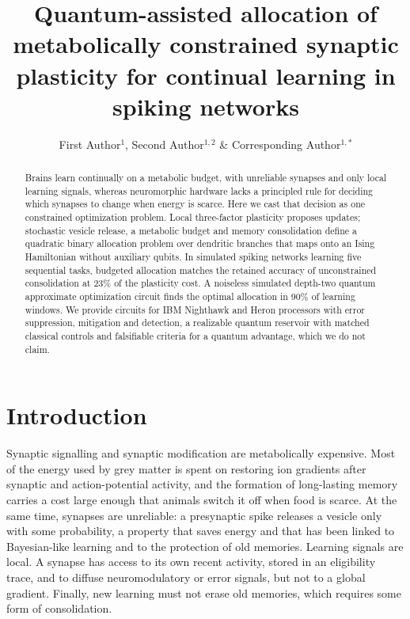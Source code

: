 
\title{Quantum-assisted allocation of metabolically constrained synaptic plasticity for continual learning in spiking networks}

\author{First Author$^{1}$, Second Author$^{1,2}$ \& Corresponding Author$^{1,*}$}


\begin{abstract}
Brains learn continually on a metabolic budget, with unreliable synapses and only local learning signals, whereas neuromorphic hardware lacks a principled rule for deciding which synapses to change when energy is scarce. Here we cast that decision as one constrained optimization problem. Local three-factor plasticity proposes updates; stochastic vesicle release, a metabolic budget and memory consolidation define a quadratic binary allocation problem over dendritic branches that maps onto an Ising Hamiltonian without auxiliary qubits. In simulated spiking networks learning five sequential tasks, budgeted allocation matches the retained accuracy of unconstrained consolidation at 23\% of the plasticity cost. A noiseless simulated depth-two quantum approximate optimization circuit finds the optimal allocation in 90\% of learning windows. We provide circuits for IBM Nighthawk and Heron processors with error suppression, mitigation and detection, a realizable quantum reservoir with matched classical controls and falsifiable criteria for a quantum advantage, which we do not claim.
\end{abstract}

\section*{Introduction}

Synaptic signalling and synaptic modification are metabolically expensive. Most of the energy used by grey matter is spent on restoring ion gradients after synaptic and action-potential activity\cite{attwell2001,harris2012}, and the formation of long-lasting memory carries a cost large enough that animals switch it off when food is scarce\cite{placais2013,li2020}. At the same time, synapses are unreliable: a presynaptic spike releases a vesicle only with some probability, a property that saves energy\cite{levy2002} and that has been linked to Bayesian-like learning\cite{malkin2024,kappel2015} and to the protection of old memories\cite{schug2021}. Learning signals are local. A synapse has access to its own recent activity, stored in an eligibility trace, and to diffuse neuromodulatory or error signals, but not to a global gradient\cite{fremaux2016,bellec2020}. Finally, new learning must not erase old memories, which requires some form of consolidation\cite{fusi2005,benna2016,kirkpatrick2017,zenke2017}.

